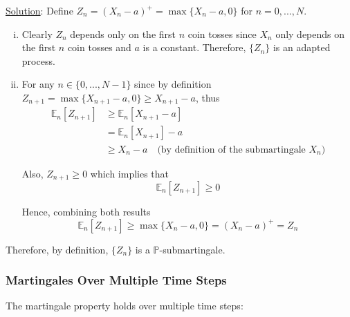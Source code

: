 \documentclass[12pt]{article}
\renewcommand{\P}{\mathbb P}
\newcommand{\E}{\mathbb E}
\begin{document}
\underline{Solution}: Define $Z_n = (X_n - a)^+ = \max \{X_n - a, 0\}$ for $n = 0,..., N$.
\begin{enumerate}[(i)]
	\item Clearly $Z_n$ depends only on the first $n$ coin tosses since $X_n$ only depends on the first $n$ coin tosses and $a$ is a constant. Therefore, $\{Z_n\}$ is an adapted process.
	\item For any $n \in \{0, ..., N - 1\}$ since by definition $Z_{n + 1} = \max \{X_{n + 1} - a, 0 \} \geq X_{n + 1} - a$, thus
	\begin{align*}
		\E_n[Z_{n + 1}] &\geq \E_n[X_{n + 1} - a] \\
		&= \E_n[X_{n + 1}] - a \\
		&\geq X_n - a \quad \text{(by definition of the submartingale } X_n)	
	\end{align*}
	
	Also, $Z_{n + 1} \geq 0$ which implies that
	\begin{equation*}
		\E_n[Z_{n + 1}] \geq 0
	\end{equation*}
	
	Hence, combining both results
	\begin{equation*}
		\E_n[Z_{n + 1}] \geq \max \{ X_n - a, 0 \} = (X_n - a)^+ = Z_n
	\end{equation*}
\end{enumerate}

Therefore, by definition, $\{Z_n\}$ is a $\P$-submartingale.

\subsubsection{Martingales Over Multiple Time Steps}

The martingale property holds over multiple time steps:
\end{document}
